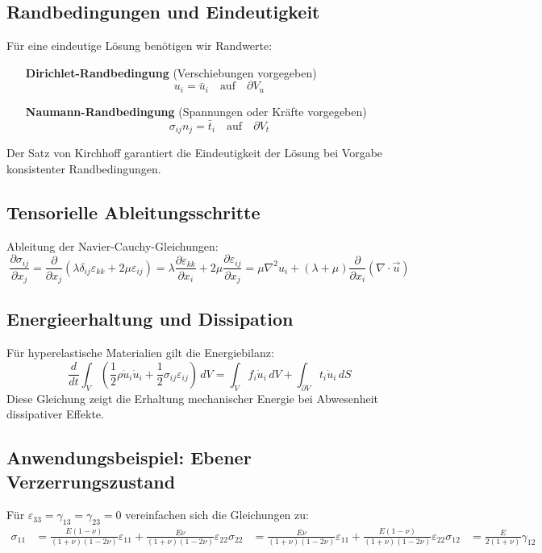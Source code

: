 \subsection{Randbedingungen und Eindeutigkeit}
Für eine eindeutige Lösung benötigen wir Randwerte:
	\begin{enumerate}
		\item[\textbf{Dirichlet-Randbedingung}] (Verschiebungen vorgegeben)
			\begin{equation}
				u_i = 
				\bar{u}_i \quad \text{auf} \quad \partial V_u
			\end{equation}
		\item[\textbf{Naumann-Randbedingung}] (Spannungen oder Kräfte vorgegeben)
			\begin{equation}
				\sigma_{ij} n_j = 
				\bar{t}_i \quad \text{auf} \quad \partial V_t
			\end{equation}		
	\end{enumerate}
Der Satz von Kirchhoff garantiert die Eindeutigkeit der Lösung bei Vorgabe konsistenter Randbedingungen.

\subsection{Tensorielle Ableitungsschritte}
Ableitung der Navier-Cauchy-Gleichungen:
	\begin{equation}
		\frac{\partial \sigma_{ij}}{\partial x_j} = 
		\frac{\partial}{\partial x_j} \left( \lambda \delta_{ij} \varepsilon_{kk} + 2\mu \varepsilon_{ij} \right) = 
		\lambda \frac{\partial \varepsilon_{kk}}{\partial x_i} + 2\mu \frac{\partial \varepsilon_{ij}}{\partial x_j}	
		= \mu \nabla^2 u_i + (\lambda + \mu) \frac{\partial}{\partial x_i} (\nabla \cdot \vec{u})
	\end{equation}

\subsection{Energieerhaltung und Dissipation}
Für hyperelastische Materialien gilt die Energiebilanz:
	\begin{equation}
		\frac{d}{dt} \int_V \left( \frac{1}{2} \rho \dot{u}_i \dot{u}_i + \frac{1}{2} \sigma_{ij} \varepsilon_{ij} \right) \, dV = 
		\int_V f_i \dot{u}_i \, dV + \int_{\partial V} t_i \dot{u}_i \, dS
	\end{equation}
Diese Gleichung zeigt die Erhaltung mechanischer Energie bei Abwesenheit dissipativer Effekte.

\subsection{Anwendungsbeispiel: Ebener Verzerrungszustand}
Für \(\varepsilon_{33} = \gamma_{13} = \gamma_{23} = 0\) vereinfachen sich die Gleichungen zu:
	\begin{align}
		\sigma_{11} &=	\frac{E (1-\nu)}{(1+\nu)(1-2\nu)} \varepsilon_{11} + \frac{E \nu}{(1+\nu)(1-2\nu)} \varepsilon_{22}
		\sigma_{22} &=	\frac{E \nu}{(1+\nu)(1-2\nu)} \varepsilon_{11} + \frac{E (1-\nu)}{(1+\nu)(1-2\nu)} \varepsilon_{22}
		\sigma_{12} &=	\frac{E}{2(1+\nu)} \gamma_{12}
	\end{align}
